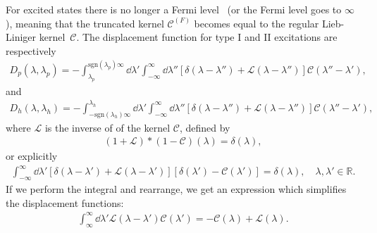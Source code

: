 \documentclass[11pt, a4paper]{report} %
\newcommand{\inversetruncc}{\mathcal{L}}
\newcommand{\kernel}{\mathcal{C}}
\begin{document}
For excited states there is no longer a Fermi level~\cite{tofind} (or the Fermi level goes to \(\infty\)), meaning that the truncated kernel \(\kernel^{(F)}\) becomes equal to the regular Lieb-Liniger kernel~\(\kernel\).
The displacement function for type I and II excitations are respectively~\cite{tofind}
\begin{align}
	D_p(\lambda, \lambda_p) = - \int_{\lambda_p}^{\textrm{sgn}(\lambda_p)\infty} \dd \lambda' \int_{-\infty}^{\infty} \dd  \lambda'' \left[\delta(\lambda-\lambda'') + \inversetruncc(\lambda-\lambda'') \right]\kernel(\lambda''-\lambda'),
\end{align}
and
\begin{align}
	D_h(\lambda, \lambda_h) = - \int_{-\textrm{sgn}(\lambda_h)\infty}^{\lambda_h} \dd \lambda' \int_{-\infty}^{\infty} \dd \lambda'' \left[\delta(\lambda-\lambda'') + \inversetruncc(\lambda - \lambda'') \right]\kernel(\lambda''-\lambda'),
\end{align}
where \(\inversetruncc\) is the inverse of of the kernel \(\kernel\), defined by~\cite{Yang1969}
\begin{align}
	(1+\inversetruncc)*(1-\kernel)(\lambda) = \delta(\lambda),
\end{align}
or explicitly
\begin{align}
	\int_{-\infty}^{\infty} \dd \lambda' \left[ \delta(\lambda-\lambda') + \inversetruncc(\lambda-\lambda') \right] \left[ \delta(\lambda') - \kernel(\lambda')\right] = \delta(\lambda), \quad \lambda, \lambda' \in \mathbb{R}.
\end{align}
If we perform the integral and rearrange, we get an expression which simplifies the displacement functions:
\begin{align}\label{eq:kernelinversion}
	\int_{\infty}^{\infty} \dd \lambda' \inversetruncc(\lambda-\lambda') \kernel(\lambda') = -\kernel(\lambda) + \inversetruncc(\lambda).
\end{align}
\end{document}
